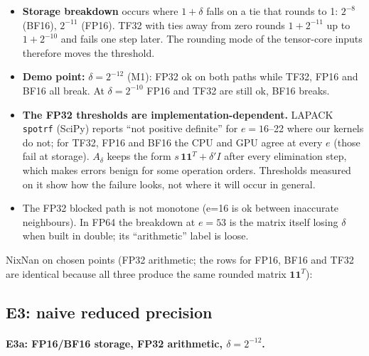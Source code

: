 \documentclass[11pt,a4paper]{article}
\begin{document}
\begin{center}\scriptsize\end{center}

\begin{center}\small\end{center}

\begin{itemize}
  \item \textbf{Storage breakdown} occurs where $1+\delta$ falls on a tie that rounds to 1: $2^{-8}$ (BF16), $2^{-11}$ (FP16). TF32 with ties away from zero rounds $1+2^{-11}$ up to $1+2^{-10}$ and fails one step later.
  The rounding mode of the tensor-core inputs therefore moves the threshold.
  \item \textbf{Demo point:} $\delta=2^{-12}$ (M1): FP32 ok on both paths while TF32, FP16 and BF16 all break. At $\delta=2^{-10}$ FP16 and TF32 are still ok, BF16 breaks.
  \item \textbf{The FP32 thresholds are implementation-dependent.} LAPACK \texttt{spotrf} (SciPy) reports ``not positive definite'' for $e=16$--22 where our kernels do not; for TF32, FP16 and BF16 the CPU and GPU agree at every $e$ (those fail at storage).
  $A_\delta$ keeps the form $s\,\mathbf{1}\mathbf{1}^T+\delta' I$ after every elimination step, which makes errors benign for some operation orders. Thresholds measured on it show how the failure looks, not where it will occur in general.
  \item The FP32 blocked path is not monotone (e=16 is ok between inaccurate neighbours). In FP64 the breakdown at $e=53$ is the matrix itself losing $\delta$ when built in double; its ``arithmetic'' label is loose.
\end{itemize}

NixNan on chosen points (FP32 arithmetic; the rows for FP16, BF16 and TF32 are identical because all three produce the same rounded matrix $\mathbf{1}\mathbf{1}^T$):

\begin{center}\scriptsize\end{center}

\subsection{E3: naive reduced precision}\label{sec:e3}

\paragraph{E3a: FP16/BF16 storage, FP32 arithmetic, $\delta=2^{-12}$.}
\end{document}
